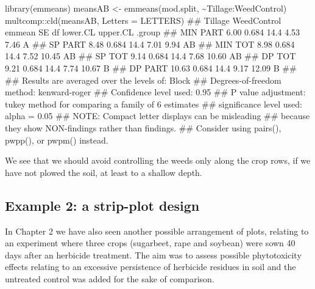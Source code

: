 \documentclass[a4paper,12pt,oneside]{book}
\newenvironment{Shaded}{\begin{snugshade}}{\end{snugshade}}
\newcommand{\SpecialCharTok}[1]{#1}
\newcommand{\DocumentationTok}[1]{#1}
\newcommand{\OtherTok}[1]{#1}
\newcommand{\FunctionTok}[1]{#1}
\newcommand{\AttributeTok}[1]{#1}
\newcommand{\AlertTok}[1]{#1}
\newcommand{\NormalTok}[1]{#1}
\begin{document}
\begin{Shaded}
\begin{Highlighting}[]
\FunctionTok{library}\NormalTok{(emmeans)}
\NormalTok{meansAB }\OtherTok{\textless{}{-}} \FunctionTok{emmeans}\NormalTok{(mod.split, }\SpecialCharTok{\textasciitilde{}}\NormalTok{Tillage}\SpecialCharTok{:}\NormalTok{WeedControl)}
\NormalTok{multcomp}\SpecialCharTok{::}\FunctionTok{cld}\NormalTok{(meansAB, }\AttributeTok{Letters =}\NormalTok{ LETTERS)}
\DocumentationTok{\#\#  Tillage WeedControl emmean    SE   df lower.CL upper.CL .group}
\DocumentationTok{\#\#  MIN     PART          6.00 0.684 14.4     4.53     7.46  A    }
\DocumentationTok{\#\#  SP      PART          8.48 0.684 14.4     7.01     9.94  AB   }
\DocumentationTok{\#\#  MIN     TOT           8.98 0.684 14.4     7.52    10.45  AB   }
\DocumentationTok{\#\#  SP      TOT           9.14 0.684 14.4     7.68    10.60  AB   }
\DocumentationTok{\#\#  DP      TOT           9.21 0.684 14.4     7.74    10.67   B   }
\DocumentationTok{\#\#  DP      PART         10.63 0.684 14.4     9.17    12.09   B   }
\DocumentationTok{\#\# }
\DocumentationTok{\#\# Results are averaged over the levels of: Block }
\DocumentationTok{\#\# Degrees{-}of{-}freedom method: kenward{-}roger }
\DocumentationTok{\#\# Confidence level used: 0.95 }
\DocumentationTok{\#\# P value adjustment: tukey method for comparing a family of 6 estimates }
\DocumentationTok{\#\# significance level used: alpha = 0.05 }
\DocumentationTok{\#\# }\AlertTok{NOTE}\DocumentationTok{: Compact letter displays can be misleading}
\DocumentationTok{\#\#       because they show NON{-}findings rather than findings.}
\DocumentationTok{\#\#       Consider using \textquotesingle{}pairs()\textquotesingle{}, \textquotesingle{}pwpp()\textquotesingle{}, or \textquotesingle{}pwpm()\textquotesingle{} instead.}
\end{Highlighting}
\end{Shaded}

We see that we should avoid controlling the weeds only along the crop rows, if we have not plowed the soil, at least to a shallow depth.

\hypertarget{example-2-a-strip-plot-design}{%
\subsection{Example 2: a strip-plot design}\label{example-2-a-strip-plot-design}}

In Chapter 2 we have also seen another possible arrangement of plots, relating to an experiment where three crops (sugarbeet, rape and soybean) were sown 40 days after an herbicide treatment. The aim was to assess possible phytotoxicity effects relating to an excessive persistence of herbicide residues in soil and the untreated control was added for the sake of comparison.
\end{document}
